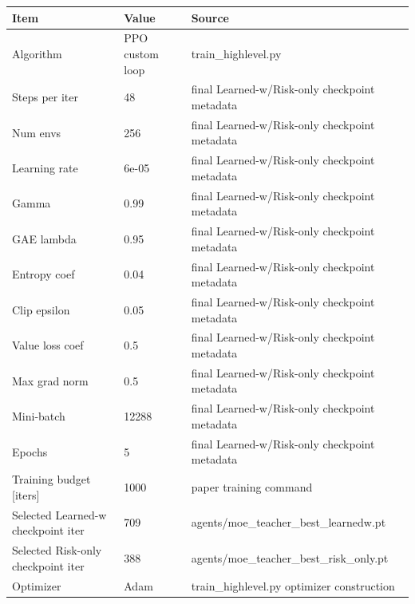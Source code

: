 \begin{tabular}{lll}
\toprule
Item & Value & Source \\
\midrule
Algorithm & PPO custom loop & train\_highlevel.py \\
Steps per iter & 48 & final Learned-w/Risk-only checkpoint metadata \\
Num envs & 256 & final Learned-w/Risk-only checkpoint metadata \\
Learning rate & 6e-05 & final Learned-w/Risk-only checkpoint metadata \\
Gamma & 0.99 & final Learned-w/Risk-only checkpoint metadata \\
GAE lambda & 0.95 & final Learned-w/Risk-only checkpoint metadata \\
Entropy coef & 0.04 & final Learned-w/Risk-only checkpoint metadata \\
Clip epsilon & 0.05 & final Learned-w/Risk-only checkpoint metadata \\
Value loss coef & 0.5 & final Learned-w/Risk-only checkpoint metadata \\
Max grad norm & 0.5 & final Learned-w/Risk-only checkpoint metadata \\
Mini-batch & 12288 & final Learned-w/Risk-only checkpoint metadata \\
Epochs & 5 & final Learned-w/Risk-only checkpoint metadata \\
Training budget [iters] & 1000 & paper training command \\
Selected Learned-w checkpoint iter & 709 & agents/moe\_teacher\_best\_learnedw.pt \\
Selected Risk-only checkpoint iter & 388 & agents/moe\_teacher\_best\_risk\_only.pt \\
Optimizer & Adam & train\_highlevel.py optimizer construction \\
\bottomrule
\end{tabular}
